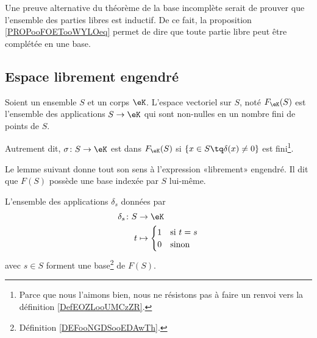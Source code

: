 \begin{normaltext}        \label{NORMooREVQooEFJWta}
	Une preuve alternative du théorème de la base incomplète serait de prouver que l'ensemble des parties libres est inductif. De ce fait, la proposition \ref{PROPooFOETooWYLOeq} permet de dire que toute partie libre peut être complétée en une base.
\end{normaltext}

\subsection{Espace librement engendré}

\begin{definition}       \label{DEFooCPNIooNxsYMY}
	Soient un ensemble \( S\) et un corps \(\eK \). L'espace vectoriel  sur \( S\), noté \( F_{\eK}(S)\) est l'ensemble des applications \( S\to \eK\) qui sont non-nulles en un nombre fini de points de \( S\).

	Autrement dit, \( \sigma\colon S\to \eK\) est dans \( F_{\eK}(S) \) si \( \{ x\in S\tq \delta(x)\neq 0 \}\) est fini\footnote{Parce que nous l'aimons bien, nous ne résistons pas à faire un renvoi vers la définition \ref{DefEOZLooUMCzZR}.}.
\end{definition}

Le lemme suivant donne tout son sens à l'expression «librement» engendré. Il dit que \( F(S)\) possède une base indexée par \( S\) lui-même.
\begin{lemma}       \label{LEMooLOPAooUNQVku}
	L'ensemble des applications \( \delta_s\) données par
	\begin{equation}
		\begin{aligned}
			\delta_s\colon S & \to \eK                            \\
			t                & \mapsto \begin{cases}
				1 & \text{si } t=s \\
				0 & \text{sinon }
			\end{cases}
		\end{aligned}
	\end{equation}
	avec \( s\in S\) forment une base\footnote{Définition \ref{DEFooNGDSooEDAwTh}.} de \( F(S)\).
\end{lemma}

